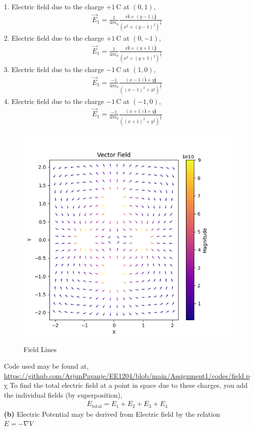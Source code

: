 \documentclass{article}
\begin{document}
1. Electric field due to the charge $ +1\,\mathrm{C} $ at $ (0, 1) $,
\begin{align*}
   \vec{E}_1 = \frac{1}{4 \pi \epsilon_0} \frac{x \mathbf{\hat{i}} + (y-1)\mathbf{\hat{j}} }{(x^2 + (y-1)^2 )^{\frac{3}{2}}}
\end{align*}
2. Electric field due to the charge $ +1\,\mathrm{C} $ at $ (0, -1) $,
\begin{align*}
   \vec{E}_1 = \frac{1}{4 \pi \epsilon_0} \frac{x \mathbf{\hat{i}} + (y+1)\mathbf{\hat{j}} }{(x^2 + (y+1)^2 )^{\frac{3}{2}}}
\end{align*}
3. Electric field due to the charge $ -1\,\mathrm{C} $ at $ (1, 0) $,
\begin{align*}
   \vec{E}_1 = \frac{-1}{4 \pi \epsilon_0} \frac{(x-1) \mathbf{\hat{i}} + y\mathbf{\hat{j}} }{((x-1)^2 + y^2 )^{\frac{3}{2}}}
\end{align*}
4. Electric field due to the charge $ -1\,\mathrm{C} $ at $ (-1, 0) $,
\begin{align*}
   \vec{E}_1 = \frac{-1}{4 \pi \epsilon_0} \frac{(x+1) \mathbf{\hat{i}} + y\mathbf{\hat{j}} }{((x+1)^2 + y^2 )^{\frac{3}{2}}}
\end{align*}
\begin{figure}[h!]
   \centering
   \includegraphics[width=0.6\columnwidth]{figs/field.png}
    \caption{Field Lines}
   \label{label}
\end{figure}
\pagebreak
Code used may be found at, \newline \url{https://github.com/ArjunPavanje/EE1204/blob/main/Assignment1/codes/field.py} \newline
To find the total electric field at a point in space due to these charges, you add the individual fields (by superposition),
\begin{align*}
E_{\text{total}} = E_1 + E_2 + E_3 + E_4
\end{align*}
\textbf{(b)} Electric Potential may be derived from Electric field by the relation $E = -\nabla V$
\end{document}
